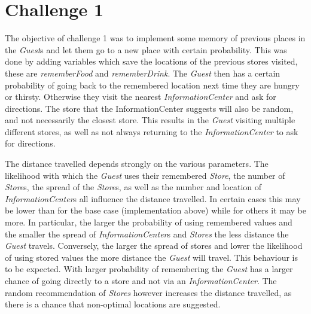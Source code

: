 \documentclass[a4paper]{article}
\begin{document}
\section{Challenge 1}
The objective of challenge 1 was to implement some memory of previous places in the \textit{Guest}s and let them go to a new place with certain probability. This was done by adding variables which save the locations of the previous stores visited, these are \textit{rememberFood} and \textit{rememberDrink}. The \textit{Guest} then has a certain probability of going back to the remembered location next time they are hungry or thirsty. Otherwise they visit the nearest \textit{InformationCenter} and ask for directions. The store that the InformationCenter suggests will also be random, and not necessarily the closest store. This results in the \textit{Guest} visiting multiple different stores, as well as not always returning to the \textit{InformationCenter} to ask for directions.

The distance travelled depends strongly on the various parameters. The likelihood with which the \textit{Guest} uses their remembered \textit{Store}, the number of \textit{Store}s, the spread of the \textit{Store}s, as well as the number and location of \textit{InformationCenter}s all influence the distance travelled. In certain cases this may be lower than for the base case (implementation above) while for others it may be more. In particular, the larger the probability of using remembered values and the smaller the spread of \textit{InformationCenter}s and \textit{Stores} the less distance the \textit{Guest} travels. Conversely, the larger the spread of stores and lower the likelihood of using stored values the more distance the \textit{Guest} will travel. This behaviour is to be expected. With larger probability of remembering the \textit{Guest} has a larger chance of going directly to a store and not via an \textit{InformationCenter}. The random recommendation of \textit{Stores} however increases the distance travelled, as there is a chance that non-optimal locations are suggested.
\end{document}
